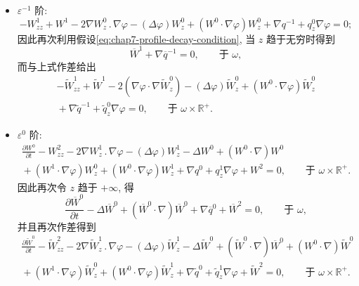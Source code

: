 \begin{sloppypar}
\begin{itemize}
\item $\varepsilon^{-1}$ 阶:
\[
 -W^1_{zz}+W^1-2\nabla W^0_z\mathbin{.}\nabla\varphi
 -(\Delta\varphi)W^0_z+(W^0\cdot\nabla\varphi)W^0_z
 +\nabla q^{-1}+q^0_z\nabla\varphi=0;
\]
因此再次利用假设\eqref{eq:chap7-profile-decay-condition}, 当 $z$ 趋于无穷时得到
\begin{equation}
 \overline W^1+\nabla\overline q^{-1}=0,\qquad\text{于 }\omega,
\label{eq:chap7-interior-W1-equation}
\end{equation}
而与上式作差给出
\begin{equation}
\begin{split}
 -\widetilde W^1_{zz}+\widetilde W^1
 -2(\nabla\varphi\cdot\nabla\widetilde W^0_z)
 -(\Delta\varphi)\widetilde W^0_z
 +(W^0\cdot\nabla\varphi)\widetilde W^0_z\\
 {}+\nabla\widetilde q^{-1}+\widetilde q^0_z\nabla\varphi=0,
 \qquad\text{于 }\omega\times\mathbb R^+.
\end{split}
\label{eq:chap7-boundary-W1-equation}
\end{equation}

\item $\varepsilon^0$ 阶:
\[
\begin{split}
 \frac{\partial W^0}{\partial t}-W^2_{zz}-2\nabla W^1_z\mathbin{.}\nabla\varphi
 -(\Delta\varphi)W^1_z-\Delta W^0+(W^0\cdot\nabla)W^0\\
 {}+(W^1\cdot\nabla\varphi)W^0_z+(W^0\cdot\nabla\varphi)W^1_z
 +\nabla q^0+q^1_z\nabla\varphi+W^2=0,
 \qquad\text{于 }\omega\times\mathbb R^+.
\end{split}
\]
因此再次令 $z$ 趋于 $+\infty$, 得
\begin{equation}
 \frac{\partial\overline W^0}{\partial t}-\Delta\overline W^0
 +(\overline W^0\cdot\nabla)\overline W^0+\nabla\overline q^0+\overline W^2=0,
 \qquad\text{于 }\omega,
\label{eq:chap7-interior-W2-equation}
\end{equation}
并且再次作差得到
\begin{equation}
\begin{split}
 \frac{\partial\widetilde W^0}{\partial t}-\widetilde W^2_{zz}
 -2\nabla\widetilde W^1_z\mathbin{.}\nabla\varphi
 -(\Delta\varphi)\widetilde W^1_z-\Delta\widetilde W^0
 +(\widetilde W^0\cdot\nabla)\overline W^0
 +(W^0\cdot\nabla)\widetilde W^0\\
 {}+(W^1\cdot\nabla\varphi)\widetilde W^0_z
 +(W^0\cdot\nabla\varphi)\widetilde W^1_z
 +\nabla\widetilde q^0+\widetilde q^1_z\nabla\varphi+\widetilde W^2=0,
 \qquad\text{于 }\omega\times\mathbb R^+.
\end{split}
\label{eq:chap7-boundary-W2-equation}
\end{equation}


\end{itemize}
\end{sloppypar}
